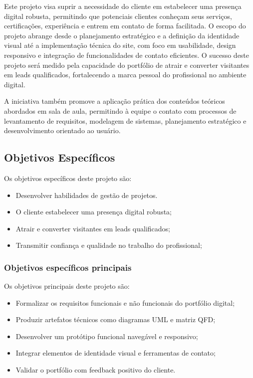 Este projeto visa suprir a necessidade do cliente em estabelecer uma presença digital robusta, permitindo que potenciais clientes conheçam seus serviços, certificações, experiência e entrem em contato de forma facilitada. O escopo do projeto abrange desde o planejamento estratégico e a definição da identidade visual até a implementação técnica do site, com foco em usabilidade, design responsivo e integração de funcionalidades de contato eficientes. O sucesso deste projeto será medido pela capacidade do portfólio de atrair e converter visitantes em leads qualificados, fortalecendo a marca pessoal do profissional no ambiente digital.

A iniciativa também promove a aplicação prática dos conteúdos teóricos abordados em sala de aula, permitindo à equipe o contato com processos de levantamento de requisitos, modelagem de sistemas, planejamento estratégico e desenvolvimento orientado ao usuário.

\label{sec:obj}

\subsection{Objetivos Específicos}
\label{ssec:objesp}

Os objetivos específicos deste projeto são:
\begin{itemize}
      \item Desenvolver habilidades de gestão de projetos.
      \item O cliente estabelecer uma presença digital robusta;
      \item Atrair e converter visitantes em leads qualificados;
      \item Transmitir confiança e qualidade no trabalho do profissional;
  \end{itemize}

\subsubsection*{Objetivos específicos principais}
\label{sssec:obj-principais}

Os objetivos principais deste projeto são:
\begin{itemize}
      \item Formalizar os requisitos funcionais e não funcionais do portfólio digital;
      \item Produzir artefatos técnicos como diagramas UML e matriz QFD;
      \item Desenvolver um protótipo funcional navegável e responsivo;
      \item Integrar elementos de identidade visual e ferramentas de contato;
      \item Validar o portfólio com feedback positivo do cliente.
  \end{itemize}

